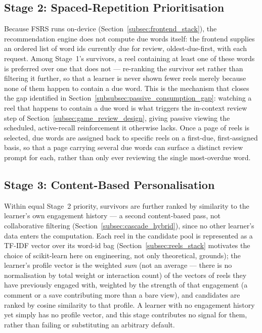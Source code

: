     \subsection{Stage 2: Spaced-Repetition Prioritisation}
    \label{subsec:stage2_design}
    Because FSRS runs on-device (Section~\ref{subsec:frontend_stack}), the recommendation engine does not compute due words itself: the frontend supplies an ordered list of word ids currently due for review, oldest-due-first, with each request. Among Stage~1's survivors, a reel containing at least one of these words is preferred over one that does not --- re-ranking the survivor set rather than filtering it further, so that a learner is never shown fewer reels merely because none of them happen to contain a due word. This is the mechanism that closes the gap identified in Section~\ref{subsubsec:passive_consumption_gap}: watching a reel that happens to contain a due word is what triggers the in-context review step of Section~\ref{subsec:game_review_design}, giving passive viewing the scheduled, active-recall reinforcement it otherwise lacks. Once a page of reels is selected, due words are assigned back to specific reels on a first-due, first-assigned basis, so that a page carrying several due words can surface a distinct review prompt for each, rather than only ever reviewing the single most-overdue word.

    \subsection{Stage 3: Content-Based Personalisation}
    \label{subsec:stage3_design}
    Within equal Stage~2 priority, survivors are further ranked by similarity to the learner's own engagement history --- a second content-based pass, not collaborative filtering (Section~\ref{subsec:cascade_hybrid}), since no other learner's data enters the computation. Each reel in the candidate pool is represented as a TF-IDF vector over its word-id bag (Section~\ref{subsec:reels_stack} motivates the choice of scikit-learn here on engineering, not only theoretical, grounds); the learner's profile vector is the weighted \emph{sum} (not an average --- there is no normalisation by total weight or interaction count) of the vectors of reels they have previously engaged with, weighted by the strength of that engagement (a comment or a save contributing more than a bare view), and candidates are ranked by cosine similarity to that profile. A learner with no engagement history yet simply has no profile vector, and this stage contributes no signal for them, rather than failing or substituting an arbitrary default.

